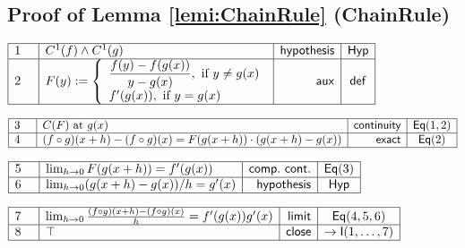 \documentclass[11pt,reqno]{amsart}
\begin{document}
	\subsection*{Proof of Lemma \protect\ref{lemi:ChainRule} (\textsf{ChainRule})}
	\noindent$\begin{array}{|m{0.5cm}|l|r|c|}
	\hline
	1 & C^{1}(f)\wedge C^{1}(g) & \mathsf{hypothesis} & \mathsf{Hyp} \\ \hline
	2 & F(y):=\left\{\begin{array}{l}\dfrac{f(y)-f(g(x))}{y-g(x)},\ \text{if }y\neq g(x)\\[4pt] f^{\prime}(g(x)),\ \text{if }y=g(x)\end{array}\right. & \mathsf{aux} & \mathsf{def} \\ \hline
	\end{array}$
	\par\nointerlineskip\noindent$\begin{array}{|m{0.5cm}|l|r|c|}
	\hline
	3 & C(F)\text{ at }g(x) & \mathsf{continuity} & \mathsf{Eq}(1,2) \\ \hline
	4 & (f\circ g)(x+h)-(f\circ g)(x)=F(g(x+h))\cdot(g(x+h)-g(x)) & \mathsf{exact} & \mathsf{Eq}(2) \\ \hline
	\end{array}$
	\par\nointerlineskip\noindent$\begin{array}{|m{0.5cm}|l|r|c|}
	\hline
	5 & \lim_{h\to0}F(g(x+h))=f^{\prime}(g(x)) & \mathsf{comp.\ cont.} & \mathsf{Eq}(3) \\ \hline
	6 & \lim_{h\to0}(g(x+h)-g(x))/h=g^{\prime}(x) & \mathsf{hypothesis} & \mathsf{Hyp} \\ \hline
	\end{array}$
	\par\nointerlineskip\noindent$\begin{array}{|m{0.5cm}|l|r|c|}
	\hline
	7 & \lim_{h\to0}\frac{(f\circ g)(x+h)-(f\circ g)(x)}{h}=f^{\prime}(g(x))g^{\prime}(x) & \mathsf{limit} & \mathsf{Eq}(4,5,6) \\ \hline
	8 & \top & \mathsf{close} & \to\mathsf{I}(1,\dots,7) \\ \hline
	\end{array}$
	\medskip
	
\end{document}
